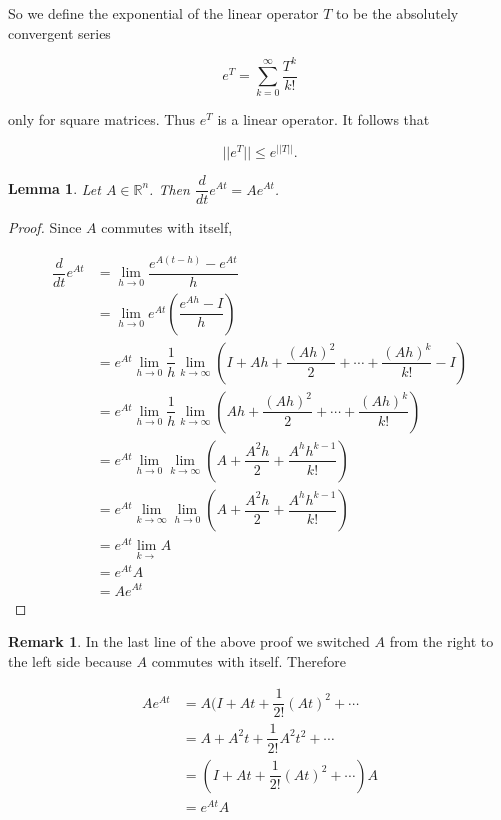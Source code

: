 \documentclass[12pt]{article}
\newtheorem*{lemma}{Lemma}
\theoremstyle{definition}
\newtheorem*{remark}{Remark}
\begin{document}
So we define the exponential of the linear operator $T$ to be the absolutely convergent series

\[ e^T = \sum^{\infty}_{k = 0} \dfrac{T^k}{k!} \]

only for square matrices. Thus $e^T$ is a linear operator. It follows that

\[ ||e^T|| \leq e^{||T||}. \]

\begin{lemma}
Let $A \in \mathbb{R}^n$. Then $\dfrac{d}{dt} e^{At} = A e^{At}$.
\end{lemma}

\begin{proof}
Since $A$ commutes with itself,

\begin{equation*}
\begin{split}
\dfrac{d}{dt} e^{At} &= \lim_{h \rightarrow 0} \dfrac{e^{A(t-h)} - e^{At}}{h} \\
&= \lim_{h \rightarrow 0} e^{At} \left( \dfrac{e^{Ah} - I}{h} \right) \\
&= e^{At} \lim_{h \rightarrow 0} \dfrac{1}{h} \lim_{k \rightarrow \infty} \left( I + Ah + \dfrac{(Ah)^2}{2} + \cdots + \dfrac{(Ah)^k}{k!} - I \right) \\
&= e^{At} \lim_{h \rightarrow 0} \dfrac{1}{h} \lim_{k \rightarrow \infty} \left( Ah + \dfrac{(Ah)^2}{2} + \cdots + \dfrac{(Ah)^k}{k!} \right) \\
&= e^{At} \lim_{h \rightarrow 0} \lim_{k \rightarrow \infty} \left( A + \dfrac{A^2h}{2} + \dfrac{A^h h^{k -1}}{k!} \right) \\
&= e^{At} \lim_{k \rightarrow \infty} \lim_{h \rightarrow 0} \left( A + \dfrac{A^2h}{2} + \dfrac{A^h h^{k -1}}{k!} \right) \\
&= e^{At} \lim_{k \rightarrow} A \\
&= e^{At} A \\
&= A e^{At}
\end{split}
\end{equation*}
\end{proof}

\begin{remark}
In the last line of the above proof we switched $A$ from the right to the left side because $A$ commutes with itself. Therefore

\begin{equation*}
\begin{split}
A e^{At} &= A(I + At + \dfrac{1}{2!} (At)^2 + \cdots \\
&= A + A^2 t + \dfrac{1}{2!} A^2 t^2 + \cdots \\
&= (I + At + \dfrac{1}{2!}(At)^2 + \cdots)A \\
&= e^{At}A
\end{split}
\end{equation*}
\end{remark}
\end{document}
